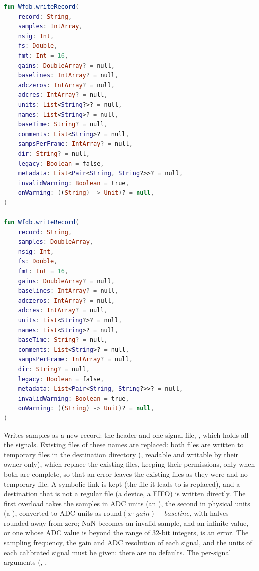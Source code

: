 \begin{lstlisting}[language=Kotlin,style=signature]
fun Wfdb.writeRecord(
    record: String,
    samples: IntArray,
    nsig: Int,
    fs: Double,
    fmt: Int = 16,
    gains: DoubleArray? = null,
    baselines: IntArray? = null,
    adczeros: IntArray? = null,
    adcres: IntArray? = null,
    units: List<String?>? = null,
    names: List<String>? = null,
    baseTime: String? = null,
    comments: List<String>? = null,
    sampsPerFrame: IntArray? = null,
    dir: String? = null,
    legacy: Boolean = false,
    metadata: List<Pair<String, String?>>? = null,
    invalidWarning: Boolean = true,
    onWarning: ((String) -> Unit)? = null,
)

fun Wfdb.writeRecord(
    record: String,
    samples: DoubleArray,
    nsig: Int,
    fs: Double,
    fmt: Int = 16,
    gains: DoubleArray? = null,
    baselines: IntArray? = null,
    adczeros: IntArray? = null,
    adcres: IntArray? = null,
    units: List<String?>? = null,
    names: List<String>? = null,
    baseTime: String? = null,
    comments: List<String>? = null,
    sampsPerFrame: IntArray? = null,
    dir: String? = null,
    legacy: Boolean = false,
    metadata: List<Pair<String, String?>>? = null,
    invalidWarning: Boolean = true,
    onWarning: ((String) -> Unit)? = null,
)
\end{lstlisting}
Writes samples as a new record: the header  and one signal file,
, which holds all the signals. Existing files of these names are
replaced: both files are written to temporary files in the destination directory
(, readable and writable by their owner only), which replace the
existing files, keeping their permissions, only when both are complete, so that an error
leaves the existing files as they were and no temporary file. A symbolic link is kept
(the file it leads to is replaced), and a destination that is not a regular file (a
device, a FIFO) is written directly. The first overload takes the samples in ADC units (an ), the
second in physical units (a ), converted to ADC units as
$\mathrm{round}(x \cdot \mathit{gain}) + \mathit{baseline}$, with halves rounded away from
zero; NaN becomes an invalid sample, and an infinite value, or one whose ADC value is
beyond the range of 32-bit integers, is an error. The sampling frequency, the gain and
ADC resolution of each signal, and the units of each calibrated signal must be given:
there are no defaults. The per-signal arguments (, ,
